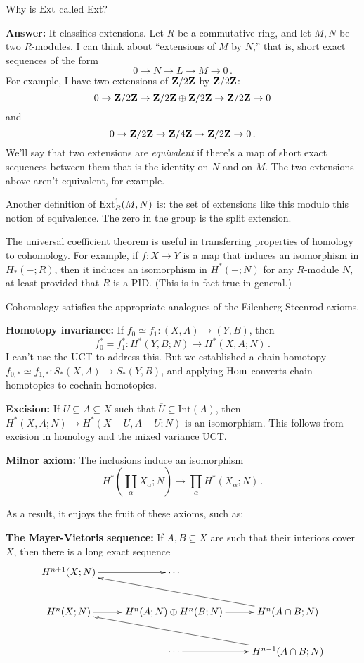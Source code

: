 \begin{question} Why is $\operatorname{Ext}$ called Ext?

\noindent
\textbf{Answer:} It classifies extensions. Let $R$ be a commutative ring, and let $M,N$ be two $R$-modules. I can think about ``extensions of $M$ by $N$,''
that is, short exact sequences of the form
\[
0\to N\to L\to M\to 0\,.
\]
For example, I have two extensions of $\mathbf Z/2\mathbf Z$ by $\mathbf Z/2\mathbf Z$: 
\[
0\to\mathbf Z/2\mathbf Z\to\mathbf Z/2\mathbf Z\oplus\mathbf Z/2\mathbf Z\to\mathbf Z/2\mathbf Z\to 0
\]
and
\[0\to \mathbf Z/2\mathbf Z\to\mathbf Z/4\mathbf Z\to\mathbf Z/2\mathbf Z\to 0\,.
\]
We'll say that two extensions are {\em equivalent} if there's a map of short exact sequences between them that is the identity on $N$ and on $M$. The two extensions above aren't equivalent, for example.

Another definition of $\operatorname{Ext}^1_R(M,N)$ is: the set of extensions like this modulo this notion of equivalence. The zero in the group is the split extension.
\end{question}

The universal coefficient theorem is useful in transferring properties of 
homology to cohomology. For example, if $f:X\to Y$ is a map that induces an
isomorphism in $H_*(-;R)$, then it induces an isomorphism in $H^*(-;N)$ for
any $R$-module $N$, at least provided that $R$ is a PID. (This is in fact 
true in general.) 

Cohomology satisfies the appropriate analogues of the Eilenberg-Steenrod axioms.

\noindent
\textbf{Homotopy invariance:}
If $f_0\simeq f_1:(X,A)\to (Y,B)$, then 
\[
f_0^*=f_1^*:H^\ast(Y,B;N)\to H^\ast(X,A;N)\,.
\]
I can't use the UCT to address this. But we established a chain homotopy $f_{0,\ast}\simeq f_{1,\ast}:S_\ast(X,A)\to S_\ast(Y,B)$, and applying $\operatorname{Hom}$ converts chain homotopies to cochain homotopies. 

\noindent
\textbf{Excision:} If $U\subseteq A\subseteq X$ such that $\overline{U}\subseteq\mathrm{Int}(A)$, then $ H^\ast(X,A;N)\to H^\ast(X-U,A-U;N)$ is an isomorphism. This follows from excision in homology and the mixed variance UCT.

\noindent
\textbf{Milnor axiom:} The inclusions induce an isomorphism
\[
H^*(\coprod_\alpha X_\alpha;N)\to \prod_\alpha H^*(X_\alpha;N)\,.
\]

As a result, it enjoys the fruit of these axioms, such as:

\noindent
\textbf{The Mayer-Vietoris sequence:} If $A,B\subseteq X$ are such that their interiors cover $X$, then there is a long exact sequence
\begin{equation*}
\xymatrix{ 
 H^{n+1}(X;N)\ar[r] & \cdots \\
 H^n(X;N)\ar[r] & H^n(A;N)\oplus H^n(B;N)\ar[r] & H^n(A\cap B;N)\ar[ull]\\
& \cdots \ar[r] & H^{n-1}(A\cap B;N) \ar[ull]
}
\end{equation*}







